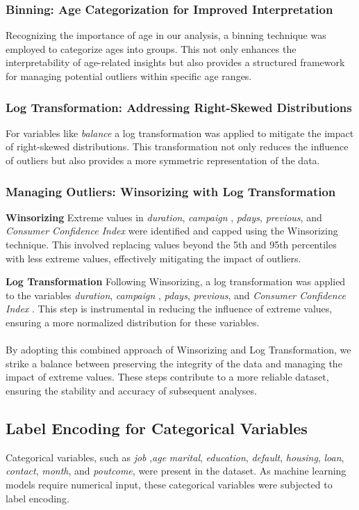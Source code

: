 \documentclass{article}
\begin{document}
\subsubsection{Binning: Age Categorization for Improved Interpretation}

Recognizing the importance of age in our analysis, a binning technique was employed to categorize ages into groups. This not only enhances the interpretability of age-related insights but also provides a structured framework for managing potential outliers within specific age ranges.

\subsubsection{Log Transformation: Addressing Right-Skewed Distributions}
For variables like \textit{balance} a log transformation was applied to mitigate the impact of right-skewed distributions. This transformation not only reduces the influence of outliers but also provides a more symmetric representation of the data.

\subsubsection{Managing Outliers: Winsorizing with Log Transformation}
\textbf{Winsorizing}
Extreme values in \textit{duration}, \textit{campaign} , \textit{pdays}, \textit{previous}, and \textit{Consumer Confidence Index}  were identified and capped using the Winsorizing technique. This involved replacing values beyond the 5th and 95th percentiles with less extreme values, effectively mitigating the impact of outliers.

\textbf{Log Transformation}
Following Winsorizing, a log transformation was applied to the variables \textit{duration}, \textit{campaign} , \textit{pdays}, \textit{previous}, and \textit{Consumer Confidence Index} . This step is instrumental in reducing the influence of extreme values, ensuring a more normalized distribution for these variables.
\\
\\
By adopting this combined approach of Winsorizing and Log Transformation, we strike a balance between preserving the integrity of the data and managing the impact of extreme values. These steps contribute to a more reliable dataset, ensuring the stability and accuracy of subsequent analyses.

\subsection{Label Encoding for Categorical Variables}
Categorical variables, such as \textit{job} ,\textit{age} \textit{marital}, \textit{education}, \textit{default}, \textit{housing}, \textit{loan}, \textit{contact}, \textit{month}, and \textit{poutcome}, were present in the dataset. As machine learning models require numerical input, these categorical variables were subjected to label encoding.
\end{document}
